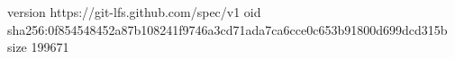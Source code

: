 version https://git-lfs.github.com/spec/v1
oid sha256:0f854548452a87b108241f9746a3cd71ada7ca6cce0c653b91800d699dcd315b
size 199671

